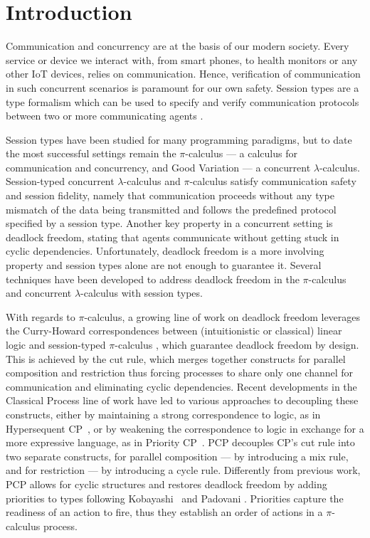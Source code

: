 \documentclass[main.tex]{subfiles}
\begin{document}
\section{Introduction}
Communication and concurrency are at the basis of our modern society. Every service or device we interact with, from smart phones, to health monitors or any other IoT devices, relies on communication. Hence, verification of communication in such concurrent scenarios is paramount for our own safety. Session types are a type formalism which can be used to specify and verify communication protocols between two or more communicating agents \cite{honda93,takeuchihonda94,hondavasconcelos98,carbonehonda07}.

Session types have been studied for many programming paradigms, but to date the most successful settings remain the $\pi$-calculus \cite{sangiorgiwalker01} ---  a calculus for communication and concurrency, and Good Variation \cite[GV]{wadler15,lindleymorris15} ---  a concurrent $\lambda$-calculus.
Session-typed concurrent $\lambda$-calculus and $\pi$-calculus satisfy communication safety and session fidelity, namely that communication proceeds without any type mismatch of the data being transmitted and follows the predefined protocol specified by a session type.
Another key property in a concurrent setting is deadlock freedom, stating that agents communicate without getting stuck in cyclic dependencies. Unfortunately, deadlock freedom is a more involving property and session types alone are not enough to guarantee it. Several techniques have been developed to address deadlock freedom in the $\pi$-calculus and concurrent $\lambda$-calculus with session types.

With regards to $\pi$-calculus, a growing line of work on deadlock freedom leverages the Curry-Howard correspondences between (intuitionistic or classical) linear logic and session-typed $\pi$-calculus \cite{cairespfenning10,wadler12}, which guarantee deadlock freedom by design. This is achieved by the cut rule, which merges together constructs for parallel composition and restriction thus forcing processes to share only one channel for communication and eliminating cyclic dependencies. Recent developments in the Classical Process \cite[CP]{wadler12} line of work have led to various approaches to decoupling these constructs, either by maintaining a strong correspondence to logic, as in Hypersequent CP~\cite[HCP]{kokkemontesi19popl,kokkemontesi19tlla}, or by weakening the correspondence to logic in exchange for a more expressive language, as in Priority CP~\cite[PCP]{dardhagay18}. PCP decouples CP's cut rule into two separate constructs, for parallel composition --- by  introducing a mix rule, and for restriction --- by introducing a cycle rule. Differently from previous work, PCP allows for cyclic structures and restores deadlock freedom by adding priorities to types following Kobayashi~\cite{kobayashi06} and Padovani \cite{padovani14}. Priorities capture the readiness of an action to fire, thus they establish an order of actions in a $\pi$-calculus process.
\end{document}
